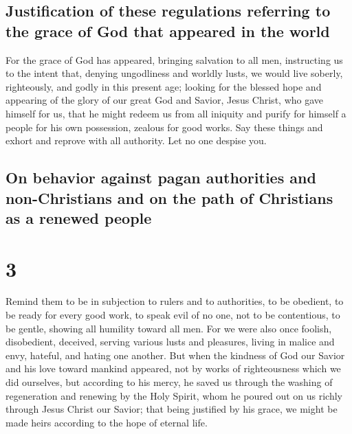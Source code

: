 \hypertarget{justification-of-these-regulations-referring-to-the-grace-of-god-that-appeared-in-the-world}{%
\subsection{Justification of these regulations referring to the grace of
God that appeared in the
world}\label{justification-of-these-regulations-referring-to-the-grace-of-god-that-appeared-in-the-world}}

 For the grace of God has appeared, bringing salvation to
all men,  instructing us to the intent that, denying
ungodliness and worldly lusts, we would live soberly, righteously, and
godly in this present age;  looking for the blessed hope
and appearing of the glory of our great God and Savior, Jesus Christ,
 who gave himself for us, that he might redeem us from
all iniquity and purify for himself a people for his own possession,
zealous for good works.  Say these things and exhort and
reprove with all authority. Let no one despise you.

\hypertarget{on-behavior-against-pagan-authorities-and-non-christians-and-on-the-path-of-christians-as-a-renewed-people}{%
\subsection{On behavior against pagan authorities and non-Christians and
on the path of Christians as a renewed
people}\label{on-behavior-against-pagan-authorities-and-non-christians-and-on-the-path-of-christians-as-a-renewed-people}}

\hypertarget{section-2}{%
\section{3}\label{section-2}}

 Remind them to be in subjection to rulers and to
authorities, to be obedient, to be ready for every good work,
 to speak evil of no one, not to be contentious, to be
gentle, showing all humility toward all men.  For we were
also once foolish, disobedient, deceived, serving various lusts and
pleasures, living in malice and envy, hateful, and hating one another.
 But when the kindness of God our Savior and his love
toward mankind appeared,  not by works of righteousness
which we did ourselves, but according to his mercy, he saved us through
the washing of regeneration and renewing by the Holy Spirit,
 whom he poured out on us richly through Jesus Christ our
Savior;  that being justified by his grace, we might be
made heirs according to the hope of eternal life.

